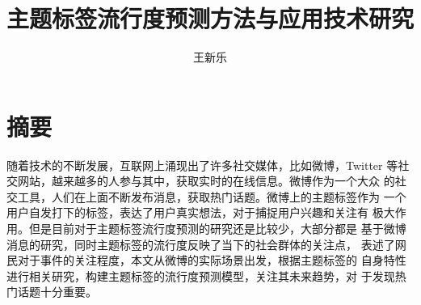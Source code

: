 \confidential{}%
\title{主题标签流行度预测方法与应用技术研究}%
\author{王新乐}%
\maketitle%
\makeenglishtitle%
\makedeclaration%
\chapter*{摘\quad 要}%
\setcounter{page}{1}%

随着技术的不断发展，互联网上涌现出了许多社交媒体，比如微博，Twitter 等社交网站，越来越多的人参与其中，获取实时的在线信息。微博作为一个大众 的社交工具，人们在上面不断发布消息，获取热门话题。微博上的主题标签作为 一个用户自发打下的标签，表达了用户真实想法，对于捕捉用户兴趣和关注有 极大作用。但是目前对于主题标签流行度预测的研究还是比较少，大部分都是 基于微博消息的研究，同时主题标签的流行度反映了当下的社会群体的关注点， 表述了网民对于事件的关注程度，本文从微博的实际场景出发，根据主题标签的 自身特性进行相关研究，构建主题标签的流行度预测模型，关注其未来趋势，对 于发现热门话题十分重要。

